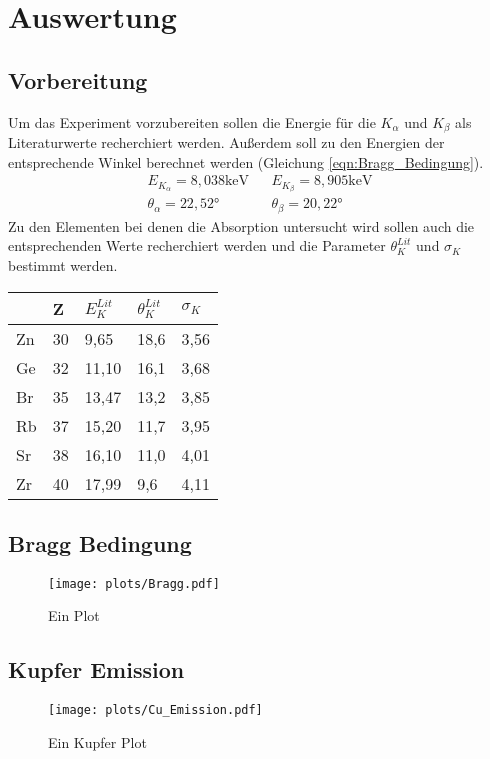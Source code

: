 \section{Auswertung}
\label{sec:Auswertung}
\subsection{Vorbereitung}
Um das Experiment vorzubereiten sollen die Energie für die $K_{\alpha}$ und $K_{\beta}$ als Literaturwerte recherchiert werden.
Außerdem soll zu den Energien der entsprechende Winkel berechnet werden (Gleichung \ref{eqn:Bragg_Bedingung}).
\begin{align}
    E_{K_{\alpha}} = 8,038 \text{keV} && E_{K_{\beta}} = 8,905 \text{keV} \\
    \theta_{\alpha} = 22,52°    &&      \theta_{\beta} = 20,22°
\end{align}
Zu den Elementen bei denen die Absorption untersucht wird sollen auch die entsprechenden Werte recherchiert werden und die Parameter $\theta_K^{Lit}$ und $\sigma_K$ bestimmt werden.
\begin{table}
\centering
\begin{tabular}{lllll}
  & Z & $E_K^{Lit}$ & $\theta_K^{Lit}$ & $\sigma_K$\\
  \toprule
Zn & 30 & 9,65 & 18,6 & 3,56\\
\midrule
Ge & 32 & 11,10 & 16,1 & 3,68\\ 
\midrule
Br & 35 & 13,47 & 13,2 & 3,85\\ 
\midrule
Rb & 37 & 15,20 & 11,7 & 3,95\\ 
\midrule
Sr & 38 & 16,10 & 11,0 & 4,01\\
\midrule
Zr & 40 & 17,99 & 9,6 & 4,11\\
\bottomrule
\end{tabular}
\end{table}

\subsection{Bragg Bedingung}
\begin{figure}
    \centering
    \texttt{[image: plots/Bragg.pdf]}
    \caption{Ein Plot}
    \label{fig:Bragg}
\end{figure}

\subsection{Kupfer Emission}
\begin{figure}
    \centering
    \texttt{[image: plots/Cu\_Emission.pdf]}
    \caption{Ein Kupfer Plot}
    \label{fig:Cu_Emission}
\end{figure}

